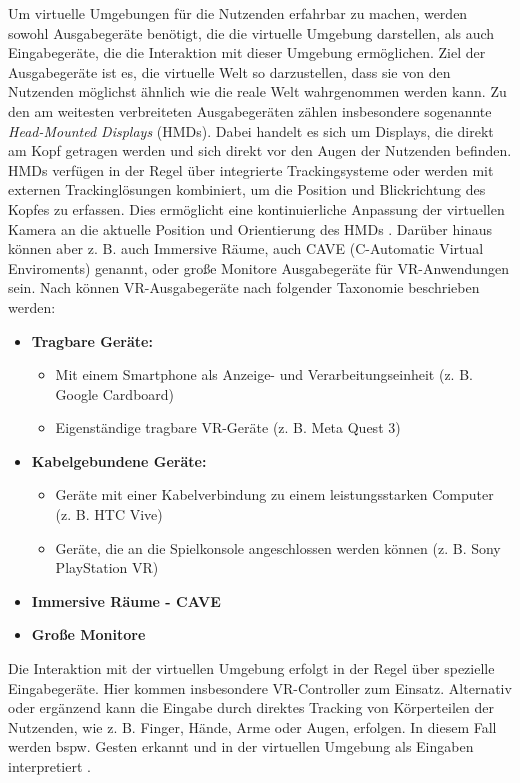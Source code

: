 Um virtuelle Umgebungen für die Nutzenden erfahrbar zu machen, werden sowohl Ausgabegeräte benötigt, die die virtuelle Umgebung darstellen, als auch Eingabegeräte, die die Interaktion mit dieser Umgebung ermöglichen. Ziel der Ausgabegeräte ist es, die virtuelle Welt so darzustellen, dass sie von den Nutzenden möglichst ähnlich wie die reale Welt wahrgenommen werden kann. Zu den am weitesten verbreiteten Ausgabegeräten zählen insbesondere sogenannte \textit{Head-Mounted Displays} (HMDs). Dabei handelt es sich um Displays, die direkt am Kopf getragen werden und sich direkt vor den Augen der Nutzenden befinden. HMDs verfügen in der Regel über integrierte Trackingsysteme oder werden mit externen Trackinglösungen kombiniert, um die Position und Blickrichtung des Kopfes zu erfassen. Dies ermöglicht eine kontinuierliche Anpassung der virtuellen Kamera an die aktuelle Position und Orientierung des HMDs \citep{dorner_virtual_2019}. Darüber hinaus können aber z. B. auch Immersive Räume, auch CAVE (C-Automatic Virtual Enviroments) genannt, oder große Monitore Ausgabegeräte für VR-Anwendungen sein. Nach \citet{somrak_estimating_2019} können VR-Ausgabegeräte nach folgender Taxonomie beschrieben werden: 

\begin{itemize}
    \item \textbf{Tragbare Geräte:} 
    \begin{itemize}
        \item Mit einem Smartphone als Anzeige- und Verarbeitungseinheit (z. B.  Google Cardboard)
        \item Eigenständige tragbare VR-Geräte (z. B.  Meta Quest 3)
    \end{itemize}
    \item \textbf{Kabelgebundene Geräte:} 
    \begin{itemize}
        \item Geräte mit einer Kabelverbindung zu einem leistungsstarken Computer (z. B.  HTC Vive)
        \item Geräte, die an die Spielkonsole angeschlossen werden können (z. B.  Sony PlayStation VR)
    \end{itemize}
    \item \textbf{Immersive Räume - CAVE}
    \item \textbf{Große Monitore}
\end{itemize}

Die Interaktion mit der virtuellen Umgebung erfolgt in der Regel über spezielle Eingabegeräte. Hier kommen insbesondere VR-Controller zum Einsatz. Alternativ oder ergänzend kann die Eingabe durch direktes Tracking von Körperteilen der Nutzenden, wie z. B.  Finger, Hände, Arme oder Augen, erfolgen. In diesem Fall werden bspw. Gesten erkannt und in der virtuellen Umgebung als Eingaben interpretiert \citep{dorner_virtual_2019}.

